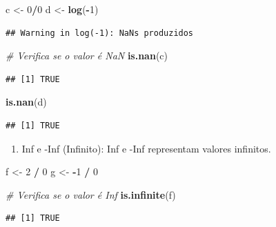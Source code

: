 \documentclass[
]{book}
\newenvironment{Shaded}{\begin{snugshade}}{\end{snugshade}}
\newcommand{\CommentTok}[1]{\textcolor[rgb]{0.56,0.35,0.01}{\textit{#1}}}
\newcommand{\DecValTok}[1]{\textcolor[rgb]{0.00,0.00,0.81}{#1}}
\newcommand{\FunctionTok}[1]{\textcolor[rgb]{0.13,0.29,0.53}{\textbf{#1}}}
\newcommand{\NormalTok}[1]{#1}
\newcommand{\OtherTok}[1]{\textcolor[rgb]{0.56,0.35,0.01}{#1}}
\newcommand{\SpecialCharTok}[1]{\textcolor[rgb]{0.81,0.36,0.00}{\textbf{#1}}}
\providecommand{\tightlist}{%
  \setlength{\itemsep}{0pt}\setlength{\parskip}{0pt}}
\begin{document}
\begin{Shaded}
\begin{Highlighting}[]
\NormalTok{c }\OtherTok{\textless{}{-}} \DecValTok{0}\SpecialCharTok{/}\DecValTok{0}
\NormalTok{d }\OtherTok{\textless{}{-}} \FunctionTok{log}\NormalTok{(}\SpecialCharTok{{-}}\DecValTok{1}\NormalTok{)}
\end{Highlighting}
\end{Shaded}

\begin{verbatim}
## Warning in log(-1): NaNs produzidos
\end{verbatim}

\begin{Shaded}
\begin{Highlighting}[]
\CommentTok{\# Verifica se o valor é NaN}
\FunctionTok{is.nan}\NormalTok{(c)}
\end{Highlighting}
\end{Shaded}

\begin{verbatim}
## [1] TRUE
\end{verbatim}

\begin{Shaded}
\begin{Highlighting}[]
\FunctionTok{is.nan}\NormalTok{(d)}
\end{Highlighting}
\end{Shaded}

\begin{verbatim}
## [1] TRUE
\end{verbatim}

\begin{enumerate}
\def\labelenumi{\arabic{enumi}.}
\setcounter{enumi}{2}
\tightlist
\item
  Inf e -Inf (Infinito): Inf e -Inf representam valores infinitos.
\end{enumerate}

\begin{Shaded}
\begin{Highlighting}[]
\NormalTok{f }\OtherTok{\textless{}{-}} \DecValTok{2} \SpecialCharTok{/} \DecValTok{0}
\NormalTok{g }\OtherTok{\textless{}{-}} \SpecialCharTok{{-}}\DecValTok{1} \SpecialCharTok{/} \DecValTok{0}  

\CommentTok{\# Verifica se o valor é Inf}
\FunctionTok{is.infinite}\NormalTok{(f)  }
\end{Highlighting}
\end{Shaded}

\begin{verbatim}
## [1] TRUE
\end{verbatim}
\end{document}
